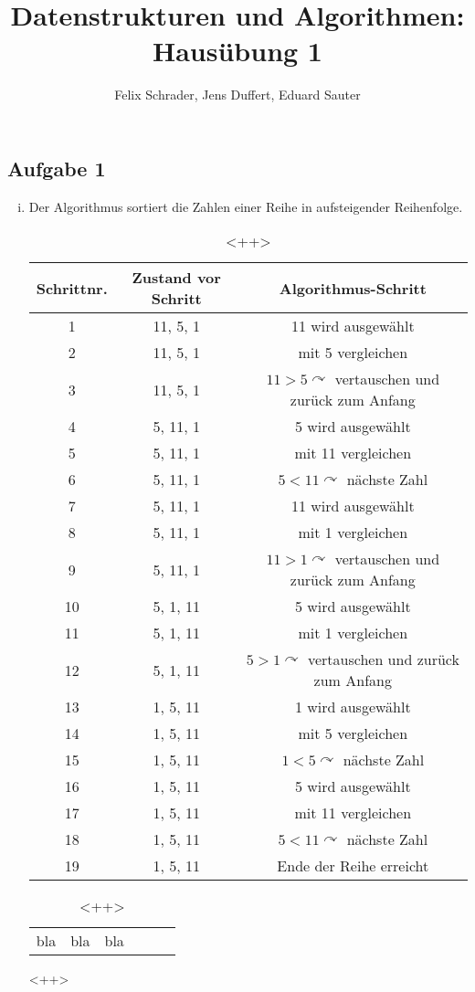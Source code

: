 \documentclass[11pt]{article}
\author{Felix Schrader, Jens Duffert, Eduard Sauter}
\title{Datenstrukturen und Algorithmen: Haus\"ubung 1}
\begin{document}
\subsection*{Aufgabe 1}
\begin{enumerate}[i)]

\item Der Algorithmus sortiert die Zahlen einer Reihe in aufsteigender Reihenfolge.

\begin{table}[h!]
\centering
\begin{tabular}{|c|c|c|}
\hline 
Schrittnr. & Zustand vor Schritt & Algorithmus-Schritt \\ 
\hline 
1 & 11, 5, 1 & 11 wird ausgew\"ahlt \\ 
\hline 
2 & 11, 5, 1 & mit 5 vergleichen \\ 
\hline 
3 & 11, 5, 1 & $11>5\curvearrowright$ vertauschen und zur\"uck zum Anfang \\ 
\hline 
4 & 5, 11, 1 & 5 wird ausgew\"ahlt \\ 
\hline 
5 & 5, 11, 1 & mit 11 vergleichen \\ 
\hline 
6 & 5, 11, 1 & $5<11\curvearrowright$ n\"achste Zahl \\ 
\hline 
7 & 5, 11, 1 & 11 wird ausgew\"ahlt \\ 
\hline 
8 & 5, 11, 1 & mit 1 vergleichen \\ 
\hline 
9 & 5, 11, 1 & $11>1\curvearrowright$ vertauschen und zur\"uck zum Anfang \\ 
\hline 
10 & 5, 1, 11 & 5 wird ausgew\"ahlt \\ 
\hline 
11 & 5, 1, 11 & mit 1 vergleichen \\ 
\hline 
12 & 5, 1, 11 & $5>1\curvearrowright$ vertauschen und zur\"uck zum Anfang \\ 
\hline 
13 & 1, 5, 11 & 1 wird ausgew\"ahlt \\ 
\hline 
14 & 1, 5, 11 & mit 5 vergleichen \\ 
\hline 
15 & 1, 5, 11 & $1<5\curvearrowright$ n\"achste Zahl \\ 
\hline 
16 & 1, 5, 11 & 5 wird ausgew\"ahlt \\ 
\hline 
17 & 1, 5, 11 & mit 11 vergleichen \\ 
\hline 
18 & 1, 5, 11 & $5<11\curvearrowright$ n\"achste Zahl \\ 
\hline 
19 & 1, 5, 11 & Ende der Reihe erreicht \\ 
\hline 
\end{tabular} 
\begin{table}[htpb]
  \centering
  \begin{tabular}{c c c c c c}
    bla & bla & bla \\
  \end{tabular}
  \caption{<++>}
\end{table}
<++>
\end{table}


\end{enumerate}
\end{document}
